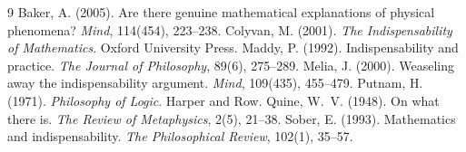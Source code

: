 \documentclass{situationist-preprint}
\begin{document}
\begin{thebibliography}{9}\small
{} Baker, A. (2005). Are there genuine mathematical explanations of physical phenomena? \emph{Mind}, 114(454), 223--238.
 Colyvan, M. (2001). \emph{The Indispensability of Mathematics}. Oxford University Press.
 Maddy, P. (1992). Indispensability and practice. \emph{The Journal of Philosophy}, 89(6), 275--289.
 Melia, J. (2000). Weaseling away the indispensability argument. \emph{Mind}, 109(435), 455--479.
 Putnam, H. (1971). \emph{Philosophy of Logic}. Harper and Row.
 Quine, W.~V. (1948). On what there is. \emph{The Review of Metaphysics}, 2(5), 21--38.
 Sober, E. (1993). Mathematics and indispensability. \emph{The Philosophical Review}, 102(1), 35--57.
\end{thebibliography}
\end{document}
